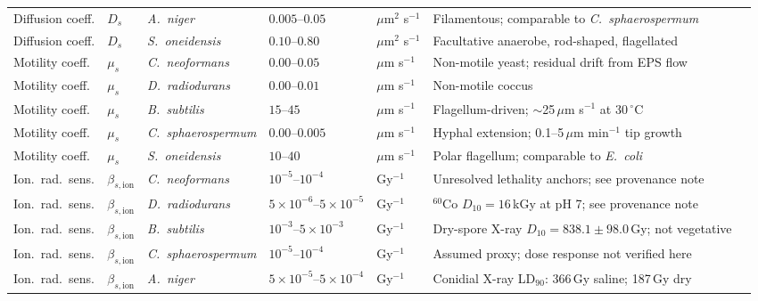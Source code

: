 \documentclass[11pt]{article}
\begin{document}
\begin{landscape}
\begin{longtable}{@{}p{2.35cm}lp{3.25cm}p{3.0cm}p{2.5cm}p{8.2cm}c@{}}
Diffusion coeff. & $D_s$ & \textit{A.\ niger}          & $0.005$--$0.05$           & $\mu$m$^2$ s$^{-1}$ & Filamentous; comparable to \textit{C.\ sphaerospermum} & \cite{dadachova2008} \\
Diffusion coeff. & $D_s$ & \textit{S.\ oneidensis}     & $0.10$--$0.80$            & $\mu$m$^2$ s$^{-1}$ & Facultative anaerobe, rod-shaped, flagellated & \cite{heidelberg2002} \\
\midrule
Motility coeff. & $\mu_s$ & \textit{C.\ neoformans}    & $0.00$--$0.05$  & $\mu$m s$^{-1}$ & Non-motile yeast; residual drift from EPS flow & \cite{dadachova2007} \\
Motility coeff. & $\mu_s$ & \textit{D.\ radiodurans}   & $0.00$--$0.01$  & $\mu$m s$^{-1}$ & Non-motile coccus & \cite{slade2011} \\
Motility coeff. & $\mu_s$ & \textit{B.\ subtilis}      & $15$--$45$      & $\mu$m s$^{-1}$ & Flagellum-driven; $\sim$25\,$\mu$m s$^{-1}$ at 30\,$^\circ$C & \cite{guttenplan2013} \\
Motility coeff. & $\mu_s$ & \textit{C.\ sphaerospermum}& $0.00$--$0.005$ & $\mu$m s$^{-1}$ & Hyphal extension; 0.1--5\,$\mu$m min$^{-1}$ tip growth & \cite{shunk2022} \\
Motility coeff. & $\mu_s$ & \textit{S.\ oneidensis}    & $10$--$40$      & $\mu$m s$^{-1}$ & Polar flagellum; comparable to \textit{E.\ coli} & \cite{heidelberg2002} \\
\midrule
Ion.\ rad.\ sens. & $\beta_{s,\mathrm{ion}}$ & \textit{C.\ neoformans}     & $10^{-5}$--$10^{-4}$              & Gy$^{-1}$ & Unresolved lethality anchors; see provenance note & \cite{dadachova2004,khajo2011} \\
Ion.\ rad.\ sens. & $\beta_{s,\mathrm{ion}}$ & \textit{D.\ radiodurans}    & $5\!\times\!10^{-6}$--$5\!\times\!10^{-5}$ & Gy$^{-1}$ & $^{60}$Co $D_{10}=16$\,kGy at pH 7; see provenance note & \cite{daly2007} \\
Ion.\ rad.\ sens. & $\beta_{s,\mathrm{ion}}$ & \textit{B.\ subtilis}       & $10^{-3}$--$5\!\times\!10^{-3}$  & Gy$^{-1}$ & Dry-spore X-ray $D_{10}=838.1\pm98.0$\,Gy; not vegetative & \cite{moeller2007} \\
Ion.\ rad.\ sens. & $\beta_{s,\mathrm{ion}}$ & \textit{C.\ sphaerospermum} & $10^{-5}$--$10^{-4}$              & Gy$^{-1}$ & Assumed proxy; dose response not verified here & \cite{zhdanova2000,shunk2022} \\
Ion.\ rad.\ sens. & $\beta_{s,\mathrm{ion}}$ & \textit{A.\ niger}          & $5\!\times\!10^{-5}$--$5\!\times\!10^{-4}$ & Gy$^{-1}$ & Conidial X-ray LD$_{90}$: 366\,Gy saline; 187\,Gy dry & \cite{cortesao2020} \\

\end{longtable}
\end{landscape}
\end{document}
